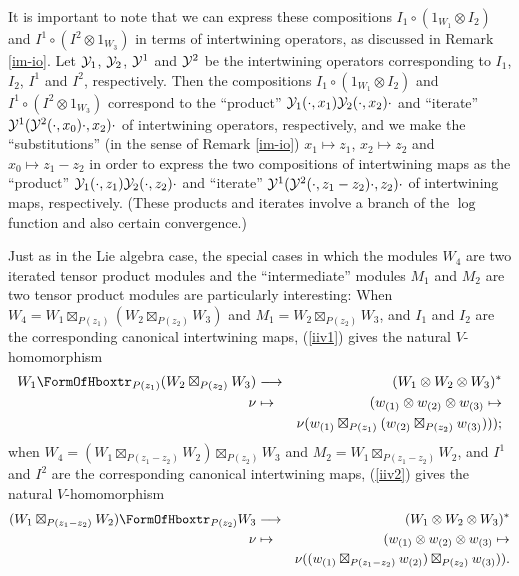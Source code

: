 \documentclass[12pt]{article}
\begin{document}
It is important to note that we can express these compositions
$I_1\circ (1_{W_1}\otimes I_2)$ and $I^1\circ (I^2\otimes 1_{W_3})$ in
terms of intertwining operators, as discussed in Remark \ref{im-io}.
Let ${\cal Y}_1$, ${\cal Y}_2$, ${\cal Y}^1$ and ${\cal Y}^2$ be the
intertwining operators corresponding to $I_1$, $I_2$, $I^1$ and $I^2$,
respectively.  Then the compositions $I_1\circ (1_{W_1}\otimes I_2)$
and $I^1\circ (I^2\otimes 1_{W_3})$ correspond to the ``product''
${\cal Y}_1(\cdot, x_1){\cal Y}_2(\cdot, x_2)\cdot$ and ``iterate''
${\cal Y}^1({\cal Y}^2(\cdot, x_0)\cdot, x_2)\cdot$ of intertwining
operators, respectively, and we make the ``substitutions'' (in the
sense of Remark \ref{im-io}) $x_1 \mapsto z_1$, $x_2 \mapsto z_2$ and
$x_0 \mapsto z_1-z_2$ in order to express the two compositions of
intertwining maps as the ``product'' ${\cal Y}_1(\cdot, z_1){\cal
Y}_2(\cdot, z_2)\cdot$ and ``iterate'' ${\cal Y}^1({\cal Y}^2(\cdot,
z_1-z_2)\cdot, z_2)\cdot$ of intertwining maps, respectively.  (These
products and iterates involve a branch of the $\log$ function and also
certain convergence.)

Just as in the Lie algebra case, the special cases in which the
modules $W_4$ are two iterated tensor product modules and the
``intermediate'' modules $M_1$ and $M_2$ are two tensor product
modules are particularly interesting: When $W_4=W_1\boxtimes_{P(z_1)}
(W_2\boxtimes_{P(z_2)} W_3)$ and $M_1=W_2\boxtimes_{P(z_2)} W_3$, and
$I_1$ and $I_2$ are the corresponding canonical intertwining maps,
(\ref{iiv1}) gives the natural $V$-homomorphism
\begin{eqnarray}
W_1\hboxtr_{P(z_1)}(W_2 \boxtimes_{P(z_2)} W_3)&\longrightarrow &
(W_1\otimes W_2\otimes W_3)^*\nno\\
\nu&\mapsto &(w_{(1)}\otimes w_{(2)}\otimes w_{(3)}\mapsto \nno\\
&&\nu(w_{(1)}\boxtimes_{P(z_1)} (w_{(2)}\boxtimes_{P(z_2)}
w_{(3)})))\nno;\\
\label{injva1}
\end{eqnarray}
when $W_4=(W_1\boxtimes_{P(z_1-z_2)} W_2)\boxtimes_{P(z_2)} W_3$ and
$M_2=W_1\boxtimes_{P(z_1-z_2)}W_2$, and $I^1$ and $I^2$ are the
corresponding canonical intertwining maps, (\ref{iiv2}) gives the
natural $V$-homomorphism
\begin{eqnarray}
(W_1 \boxtimes_{P(z_1-z_2)} W_2)\hboxtr_{P(z_2)} W_3&\longrightarrow &
(W_1\otimes W_2\otimes
W_3)^*\nno\\
\nu&\mapsto &(w_{(1)}\otimes w_{(2)}\otimes w_{(3)}\mapsto \nno\\
&&\nu((w_{(1)}\boxtimes_{P(z_1-z_2)} w_{(2)})\boxtimes_{P(z_2)}
w_{(3)})).\nno\\
\label{injva2}
\end{eqnarray}
\end{document}
